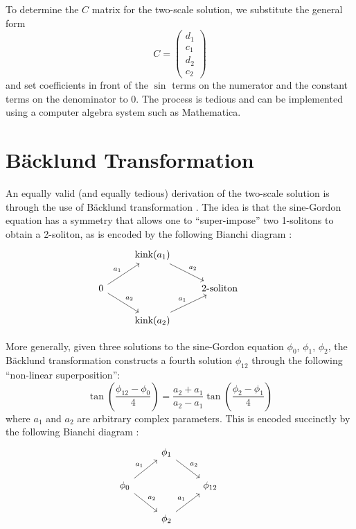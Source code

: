 \documentclass{report}
\begin{document}
To determine the $C$ matrix for the two-scale solution, we substitute the general form
\begin{equation}
  C = \left(\begin{array}{c}
    d_1\\
    c_1\\
    d_2\\
    c_2
  \end{array}\right)
\end{equation}
and set coefficients in front of the $\sin$ terms on the numerator and the constant terms on the denominator to 0. The process is tedious and can be implemented using a computer algebra system such as Mathematica.

\section{B\"acklund Transformation}
An equally valid (and equally tedious) derivation of the two-scale solution is through the use of B\"acklund transformation \cite{Dodd499, hietarinta1997introduction, Cuenda20111047}. The idea is that the sine-Gordon equation has a symmetry that allows one to ``super-impose'' two 1-solitons to obtain a 2-soliton, as is encoded by the following Bianchi diagram \cite{Cuenda20111047}:
\[
\begin{tikzcd}
  & \text{kink}(a_1) \arrow{dr}{a_2} &&\\
  0\arrow{ur}{a_1}\arrow{dr}{a_2}&&\text{2-soliton}&\\
 &\text{kink}(a_2)\arrow{ur}{a_1}&&
\end{tikzcd}
\]

More generally, given three solutions to the sine-Gordon equation $\phi_0$, $\phi_1$, $\phi_2$, the B\"acklund transformation constructs a fourth solution $\phi_{12}$ through the following ``non-linear superposition'':
\begin{equation}
  \tan \left(\frac{\phi_{12}-\phi_0}{4}\right) = \frac{a_2+a_1}{a_2-a_1} \tan \left(\frac{\phi_2-\phi_1}{4}\right)
\end{equation}
where $a_1$ and $a_2$ are arbitrary complex parameters. This is encoded succinctly by the following Bianchi diagram \cite{Cuenda20111047}:
\begin{equation}\label{bianchi}
\begin{tikzcd}
  & \phi_1 \arrow{dr}{a_2} &&\\
  \phi_0\arrow{ur}{a_1}\arrow{dr}{a_2}&&\phi_{12}&\\
 &\phi_2\arrow{ur}{a_1}&&
\end{tikzcd}
\end{equation}
\end{document}
